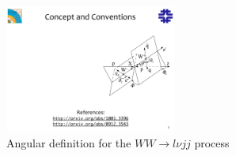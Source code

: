

\begin{figure}[ht]
  \centering
  \includegraphics[width=0.5\textwidth]{Pictures/2012_MVAangles_wwlvjj.pdf}
  \caption{\label{fig:anglesWWlvjj}Angular definition for the $WW\to l\nu jj$ process}
\end{figure}


